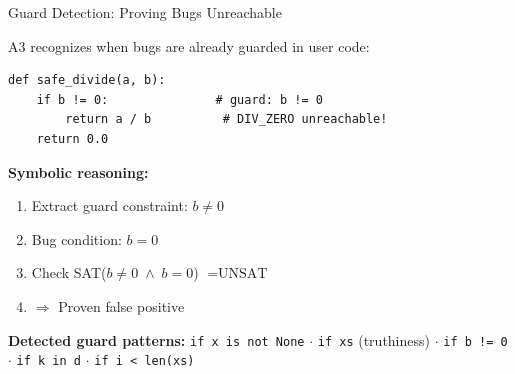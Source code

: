 \documentclass[aspectratio=169]{beamer}
\begin{document}
\begin{frame}[fragile]{Guard Detection: Proving Bugs Unreachable}

A3 recognizes when bugs are already guarded in user code:

\begin{lstlisting}
def safe_divide(a, b):
    if b != 0:               # guard: b != 0
        return a / b          # DIV_ZERO unreachable!
    return 0.0
\end{lstlisting}

\textbf{Symbolic reasoning:}
\begin{enumerate}
  \item Extract guard constraint: $b \neq 0$
  \item Bug condition: $b = 0$
  \item Check SAT($b \neq 0 \;\land\; b = 0$) $= \text{UNSAT}$
  \item $\Rightarrow$ Proven false positive
\end{enumerate}

\vspace{0.3em}
\textbf{Detected guard patterns:}
\texttt{if x is not None} $\cdot$
\texttt{if xs} (truthiness) $\cdot$
\texttt{if b != 0} $\cdot$
\texttt{if k in d} $\cdot$
\texttt{if i < len(xs)}

\end{frame}
\end{document}
